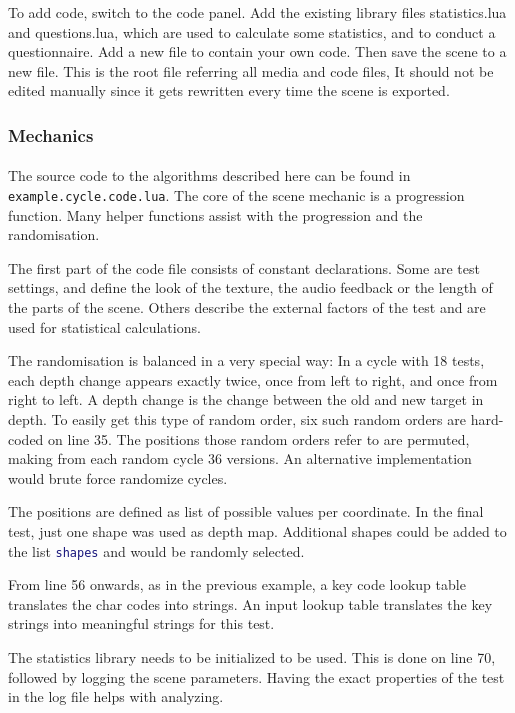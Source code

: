 To add code, switch to the code panel.
Add the existing library files statistics.lua and questions.lua, which are used to calculate some statistics, and to conduct a questionnaire.
Add a new file to contain your own code.
Then save the scene to a new file.
This is the root file referring all media and code files, It should not be edited manually since it gets rewritten every time the scene is exported.

\subsubsection{Mechanics}
\paragraph{}
The source code to the algorithms described here can be found in \texttt{example.cycle.code.lua}.
The core of the scene mechanic is a progression function.
Many helper functions assist with the progression and the randomisation.

The first part of the code file consists of constant declarations.
Some are test settings, and define the look of the texture, the audio feedback or the length of the parts of the scene.
Others describe the external factors of the test and are used for statistical calculations.

The randomisation is balanced in a very special way:
In a cycle with 18 tests, each depth change appears exactly twice, once from left to right, and once from right to left.
A depth change is the change between the old and new target in depth.
To easily get this type of random order, six such random orders are hard-coded on line 35.
The positions those random orders refer to are permuted, making from each random cycle 36 versions.
An alternative implementation would brute force randomize cycles.

The positions are defined as list of possible values per coordinate.
In the final test, just one shape was used as depth map.
Additional shapes could be added to the list \lstinline[language=lua]{shapes} and would be randomly selected.

From line 56 onwards, as in the previous example, a key code lookup table translates the char codes into strings.
An input lookup table translates the key strings into meaningful strings for this test.

The statistics library needs to be initialized to be used.
This is done on line 70, followed by logging the scene parameters.
Having the exact properties of the test in the log file helps with analyzing.

